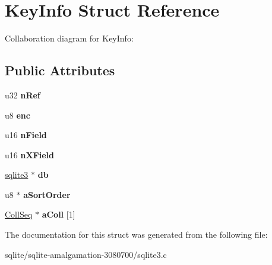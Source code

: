 \hypertarget{struct_key_info}{\section{Key\+Info Struct Reference}
\label{struct_key_info}
}


Collaboration diagram for Key\+Info\+:
\subsection*{Public Attributes}
\begin{DoxyCompactItemize}
\item 
\hypertarget{struct_key_info_a4f6162c8d1ecc9e3c7471571e8918972}{u32 {\bfseries n\+Ref}}\label{struct_key_info_a4f6162c8d1ecc9e3c7471571e8918972}

\item 
\hypertarget{struct_key_info_a37972825f9a148668e979be12465e832}{u8 {\bfseries enc}}\label{struct_key_info_a37972825f9a148668e979be12465e832}

\item 
\hypertarget{struct_key_info_af70436487a95e445d540bfc4ca1d3f0b}{u16 {\bfseries n\+Field}}\label{struct_key_info_af70436487a95e445d540bfc4ca1d3f0b}

\item 
\hypertarget{struct_key_info_ac77a6b68f879a69127a8797b62a2f3aa}{u16 {\bfseries n\+X\+Field}}\label{struct_key_info_ac77a6b68f879a69127a8797b62a2f3aa}

\item 
\hypertarget{struct_key_info_af2e7a3a411f5ca1ccf6de77d320b59db}{\hyperlink{structsqlite3}{sqlite3} $\ast$ {\bfseries db}}\label{struct_key_info_af2e7a3a411f5ca1ccf6de77d320b59db}

\item 
\hypertarget{struct_key_info_ac5fe4bd0172a1f11f41f678528a7b21e}{u8 $\ast$ {\bfseries a\+Sort\+Order}}\label{struct_key_info_ac5fe4bd0172a1f11f41f678528a7b21e}

\item 
\hypertarget{struct_key_info_ad43aa024fca5a065e75d8e24b231adcb}{\hyperlink{struct_coll_seq}{Coll\+Seq} $\ast$ {\bfseries a\+Coll} \mbox{[}1\mbox{]}}\label{struct_key_info_ad43aa024fca5a065e75d8e24b231adcb}

\end{DoxyCompactItemize}


The documentation for this struct was generated from the following file\+:\begin{DoxyCompactItemize}
\item 
sqlite/sqlite-\/amalgamation-\/3080700/sqlite3.\+c\end{DoxyCompactItemize}
